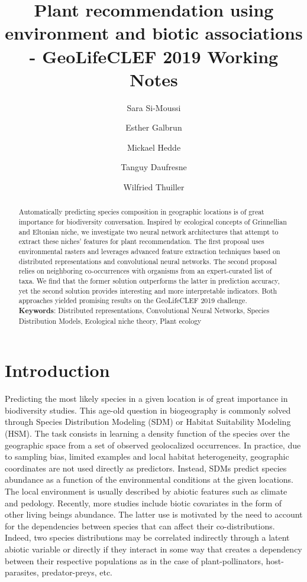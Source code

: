 \documentclass[]{article}
\title{Plant recommendation using environment and biotic associations - GeoLifeCLEF 2019 Working Notes}
\author[1,2,3]{Sara Si-Moussi}
\author[2]{Esther Galbrun}
\author[1]{Mickael Hedde}
\author[1]{Tanguy Daufresne}
\author[3]{Wilfried Thuiller}
\affil[1]{Eco\&Sols, UMR 1222 INRA-Montpellier SupAgro, Montpellier}
\affil[2]{Loria, UMR 7503 Inria, Vandœuvre-lès-Nancy}
\affil[3]{LECA, UMR 5553 CNRS-Université Grenoble Alpes, Saint-Martin-d'Hères}
\date{}                     %
\begin{document}
	
	\maketitle

\begin{abstract}
	\noindent Automatically predicting species composition in geographic locations is of great importance for biodiversity conversation. Inspired by ecological concepts of Grinnellian and Eltonian niche, we investigate two neural network architectures that attempt to extract these niches' features for plant recommendation.  The first proposal uses environmental rasters and leverages advanced feature extraction techniques based on distributed representations and convolutional neural networks. The second proposal relies on neighboring co-occurrences with organisms from an expert-curated list of taxa. We find that the former solution outperforms the latter in prediction accuracy, yet the second solution provides interesting and more interpretable indicators. Both approaches yielded promising results on the GeoLifeCLEF 2019 challenge. \\
	
	\noindent \textbf{Keywords}: Distributed representations, Convolutional Neural Networks, Species Distribution Models, Ecological niche theory, Plant ecology
\end{abstract}


\section{Introduction}
Predicting the most likely species in a given location is of great importance in biodiversity studies. This age-old question in biogeography is commonly solved through Species Distribution Modeling (SDM) or Habitat Suitability Modeling (HSM). The task consists in learning a density function of the species over the geographic space from a set of observed geolocalized occurrences. In practice, due to sampling bias, limited examples and local habitat heterogeneity, geographic coordinates are not used directly as predictors. Instead, SDMs predict species abundance as a function of the environmental conditions at the given locations.\\

\noindent The local environment is usually described by abiotic features such as climate and pedology. Recently, more studies include biotic covariates in the form of other living beings abundance. The latter use is motivated by the need to account for the dependencies between species that can affect their co-distributions. Indeed, two species distributions may be correlated indirectly through a latent abiotic variable or directly if they interact in some way that creates a dependency between their respective populations as in the case of plant-pollinators, host-parasites, predator-preys, etc.\\
\end{document}

